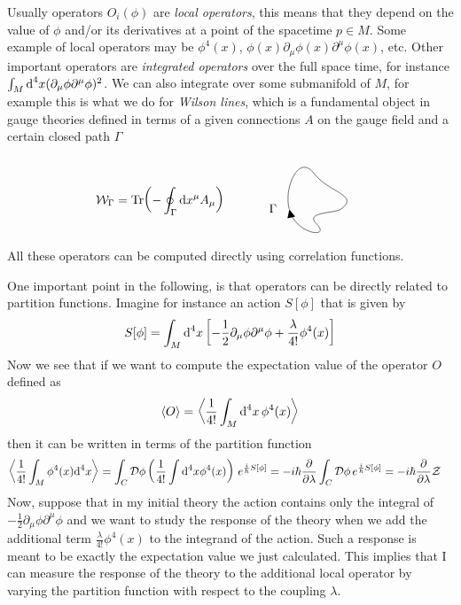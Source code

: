 \documentclass[../main/main.tex]{subfiles}
\begin{document}
Usually operators $O_i(\phi)$ are \emph{local operators}, this means that they depend on the value of $\phi$ and/or its derivatives at a point of the spacetime $p\in M$. Some example of local operators may be $\phi^4(x)$, $\phi(x)\partial_\mu\phi(x)\partial^\mu\phi(x)$, etc. Other important operators are \emph{integrated operators} over the full space time, for instance $\int_M\textup{d}^4x(\partial_\mu\phi\partial^\mu\phi)^2$. We can also integrate over some submanifold of $M$, for example this is what we do for \emph{Wilson lines}, which is a fundamental object in gauge theories defined in terms of a given connections $A$ on the gauge field and a certain closed path $\Gamma$
\vspace{-0.5cm}
\[\mathcal W_\Gamma=\Tr(-\oint_\Gamma\de x^\mu A_\mu)
\qquad\quad
\raisebox{-1cm}{
\begin{tikzpicture}[x=0.75pt,y=0.75pt,yscale=-1,xscale=1]
\draw    (239.3,173.79) .. controls (232.75,151.54) and (249.05,112.33) .. (265.88,134.64) .. controls (282.38,155.95) and (316.29,158.19) .. (294.59,173.84) .. controls (285.8,178.31) and (255.18,176.47) .. (269.03,189.74) .. controls (284.07,205.31) and (248.5,201.19) .. (240.1,176.56) ;
\draw [shift={(239.3,173.79)}, rotate = 436.39] [fill={rgb, 255:red, 0; green, 0; blue, 0 }  ][line width=0.08]  [draw opacity=0] (8.93,-4.29) -- (0,0) -- (8.93,4.29) -- cycle    ;
\draw (221.56,172.66) node    {$\Gamma $};
\end{tikzpicture}
}\]
All these operators can be computed directly using correlation functions. 

One important point in the following, is that operators can be directly related to partition functions. Imagine for instance an action $S[\phi]$ that is given by
\[S[\phi]=\int_M\textup{d}^4x\left[-\frac12\partial_\mu\phi\partial^\mu\phi+\frac\lambda{4!}\phi^4(x)\right]\]
Now we see that if we want to compute the expectation value of the operator $O$ defined as
\[\langle O\rangle=\left\langle\frac1{4!}\int_M\textup{d}^4x\,\phi^4(x)\right\rangle\]
then it can be written in terms of the partition function
\begin{align*}
\left\langle\frac1{4!}\int_M\phi^4(x)\textup{d}^4x\right\rangle
&=\int_C\mathcal D\phi\left(\frac{1}{4!}\int\textup{d}^4x\phi^4(x)\right)\,e^{\frac i\hbar S[\phi]}
=-i\hbar\frac{\partial}{\partial\lambda}\int_C\mathcal D\phi \,e^{\frac i\hbar S[\phi]}
=-i\hbar\frac{\partial}{\partial\lambda}\mathcal Z
\end{align*}
Now, suppose that in my initial theory the action contains only the integral of $-\frac12\partial_\mu\phi\partial^\mu\phi$ and we want to study the response of the theory when we add the additional term $\frac\lambda{4!}\phi^4(x)$ to the integrand of the action. Such a response is meant to be exactly the expectation value we just calculated. 
This implies that I can measure the response of the theory to the additional local operator by varying the partition function with respect to the coupling $\lambda$. 
\end{document}

